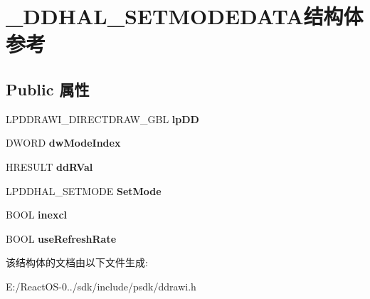 \hypertarget{struct___d_d_h_a_l___s_e_t_m_o_d_e_d_a_t_a}{}\section{\+\_\+\+D\+D\+H\+A\+L\+\_\+\+S\+E\+T\+M\+O\+D\+E\+D\+A\+T\+A结构体 参考}
\label{struct___d_d_h_a_l___s_e_t_m_o_d_e_d_a_t_a}
\subsection*{Public 属性}
\begin{DoxyCompactItemize}
\item 
\mbox{\label{struct___d_d_h_a_l___s_e_t_m_o_d_e_d_a_t_a_adefdb451438ecd970fa1a302afec6167}} 
L\+P\+D\+D\+R\+A\+W\+I\+\_\+\+D\+I\+R\+E\+C\+T\+D\+R\+A\+W\+\_\+\+G\+BL {\bfseries lp\+DD}
\item 
\mbox{\label{struct___d_d_h_a_l___s_e_t_m_o_d_e_d_a_t_a_a92f5964e354845c3e3dc4fd75f38843a}} 
D\+W\+O\+RD {\bfseries dw\+Mode\+Index}
\item 
\mbox{\label{struct___d_d_h_a_l___s_e_t_m_o_d_e_d_a_t_a_a5e0d01363308c486dc14e8d667f5a72d}} 
H\+R\+E\+S\+U\+LT {\bfseries dd\+R\+Val}
\item 
\mbox{\label{struct___d_d_h_a_l___s_e_t_m_o_d_e_d_a_t_a_a2732ad73844a53c78dd26ca10eb1e0b6}} 
L\+P\+D\+D\+H\+A\+L\+\_\+\+S\+E\+T\+M\+O\+DE {\bfseries Set\+Mode}
\item 
\mbox{\label{struct___d_d_h_a_l___s_e_t_m_o_d_e_d_a_t_a_a08d3693933342f698f945102631293c4}} 
B\+O\+OL {\bfseries inexcl}
\item 
\mbox{\label{struct___d_d_h_a_l___s_e_t_m_o_d_e_d_a_t_a_ab42d408d9d2149fcd85b9d8061a632a2}} 
B\+O\+OL {\bfseries use\+Refresh\+Rate}
\end{DoxyCompactItemize}


该结构体的文档由以下文件生成\+:\begin{DoxyCompactItemize}
\item 
E\+:/\+React\+O\+S-\/0../sdk/include/psdk/ddrawi.\+h\end{DoxyCompactItemize}
